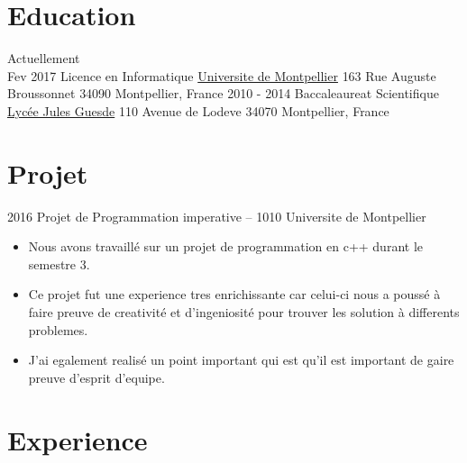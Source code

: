 \documentclass[letterpaper]{cv} %
\begin{document}
\makeprofile %

\section{Education}

\begin{twenty} %
	\twentyitem
    	{Actuellement \\ Fev 2017}
        {Licence en Informatique}
        {\href{http://www.umontpellier.fr/}{Universite de Montpellier}}
        {163 Rue Auguste Broussonnet}
        {34090 Montpellier, France}
	\twentyitem
    	{2010 - 2014}
        {Baccaleaureat Scientifique}
        {\href{http://www.julesguesde.fr/}{Lycée Jules Guesde}}
        {110 Avenue de Lodeve}
        {34070 Montpellier, France}
\end{twenty}


\section{Projet}
\begin{twenty}
	\twentyitem
    	{2016}
        {Projet de Programmation imperative -- 1010}
        {{Universite de Montpellier}}
        {}
        {
        {\begin{itemize}
        \item Nous avons travaillé sur un projet de programmation en c++ durant le semestre 3.
        \item Ce projet fut une experience tres enrichissante car celui-ci nous a poussé à faire preuve de creativité et d'ingeniosité pour trouver les solution à differents problemes.
        \item J'ai egalement realisé un point important qui est qu'il est important de gaire preuve d'esprit d'equipe.
    \end{itemize}}
        }
\end{twenty}


\section{Experience}
\end{document}
